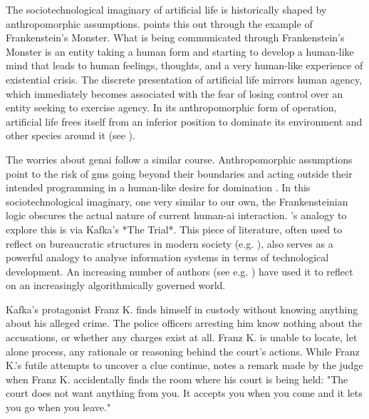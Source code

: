 The sociotechnological imaginary of artificial life is historically shaped by
anthropomorphic assumptions. \citeauthor{dishon2024} points this out through the
example of Frankenstein's Monster. What is being communicated through
Frankenstein's Monster is an entity taking a human form and starting to
develop a human-like mind that leads to human feelings, thoughts, and a very
human-like experience of existential crisis. The discrete presentation of
artificial life mirrors human agency, which immediately becomes
associated with the
fear of losing control over an entity seeking to exercise agency. In its
anthropomorphic form of operation, artificial life frees itself from an
inferior position to dominate its environment and other species around it (see
\cite[966]{dishon2024}).

The worries about \gls{genai} follow a similar course. Anthropomorphic
assumptions point to the risk of \glspl{gm} going beyond their boundaries and
acting outside their intended programming in a human-like desire for domination \parencite[967-968]{dishon2024}.
In this sociotechnological imaginary, one very similar to our own, the Frankensteinian logic
obscures the actual nature of current human-\gls{ai} interaction.
\cite{dishon2024}'s analogy to explore this is via Kafka's *The Trial*. This piece
of literature, often used to reflect on bureaucratic
structures in modern society (e.g. \cite{deleuze2008}), also serves as a powerful
analogy to analyse information systems in terms of technological development.
An increasing number of authors (see e.g.
\cite{prinsloo2017, dishon2024}) have used it to reflect on an
increasingly algorithmically governed world.

Kafka's protagonist Franz K. finds himself in custody without knowing anything
about his alleged crime. The police officers arresting him know nothing
about the accusations, or whether any charges exist at all. Franz K. is
unable to locate, let alone process, any rationale or reasoning
behind the court's actions. While Franz K.'s futile attempts to uncover a clue
continue, \cite{dishon2024} notes a remark made by the judge when Franz K. accidentally finds
the room where his court is being held: "The court does not want anything from you. It accepts you when you come and it lets you go when you leave."

